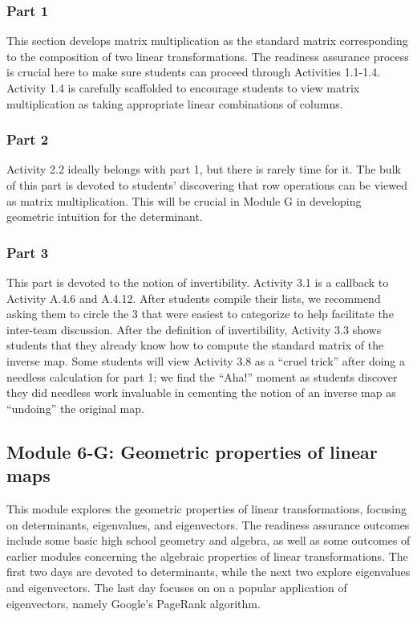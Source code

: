 \documentclass{article}
\begin{document}
\subsubsection*{Part 1}
This section develops matrix multiplication as the standard matrix corresponding to the composition of two linear transformations.  The readiness assurance process is crucial here to make sure students can proceed through Activities 1.1-1.4.  Activity 1.4 is carefully  scaffolded to encourage students to view matrix multiplication as taking appropriate linear combinations of columns. 

\subsubsection*{Part 2}
Activity 2.2 ideally belongs with part 1, but there is rarely time for it.  The bulk of this part is devoted to students' discovering that row operations can be viewed as matrix multiplication.  This will be crucial in Module G in developing geometric intuition for the determinant.  

\subsubsection*{Part 3}
This part is devoted to the notion of invertibility.  Activity 3.1 is a callback to Activity A.4.6 and A.4.12.  After students compile their lists, we recommend asking them to circle the 3 that were easiest to categorize to help facilitate the inter-team discussion.   After the definition of invertibility, Activity 3.3 shows students that they already know how to compute the standard matrix of the inverse map.  Some students will view Activity 3.8 as a ``cruel trick'' after doing a needless calculation for part 1; we find the ``Aha!'' moment as students discover they did needless work invaluable in cementing the notion of an inverse map as ``undoing'' the original map.

\subsection*{Module 6-G: Geometric properties of linear maps}

This module explores the geometric properties of linear transformations, focusing on determinants, eigenvalues, and eigenvectors.  The readiness assurance outcomes include some basic high school geometry and algebra, as well as some outcomes of earlier modules concerning the algebraic properties of linear transformations.  The first two days are devoted to determinants, while the next two explore eigenvalues and eigenvectors.  The last day focuses on on a popular application of eigenvectors, namely Google's PageRank algorithm.
\end{document}
